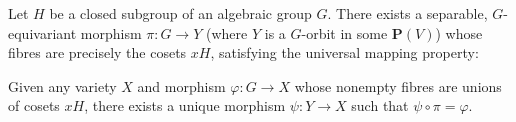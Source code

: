 Let $H$ be a closed subgroup of an algebraic group $G$. There exists a separable, $G$-equivariant morphism $\pi: G \rightarrow Y$ (where $Y$ is a $G$-orbit in some $\mathbf{P}(V)$) whose fibres are precisely the cosets $xH$, satisfying the universal mapping property:

Given any variety $X$ and morphism $\varphi: G \rightarrow X$ whose nonempty fibres are unions of cosets $xH$, there exists a unique morphism $\psi: Y \rightarrow X$ such that $\psi \circ \pi = \varphi$.
